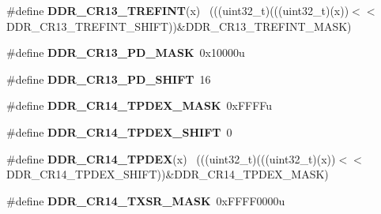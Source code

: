 \begin{DoxyCompactItemize}
\item 
\hypertarget{group___d_d_r___register___masks_ga8ed5ff0b56124f79d539d04e62c76d9a}{}\#define {\bfseries D\+D\+R\+\_\+\+C\+R13\+\_\+\+T\+R\+E\+F\+I\+N\+T}(x)                                        ~(((uint32\+\_\+t)(((uint32\+\_\+t)(x))$<$$<$D\+D\+R\+\_\+\+C\+R13\+\_\+\+T\+R\+E\+F\+I\+N\+T\+\_\+\+S\+H\+I\+F\+T))\&D\+D\+R\+\_\+\+C\+R13\+\_\+\+T\+R\+E\+F\+I\+N\+T\+\_\+\+M\+A\+S\+K)\label{group___d_d_r___register___masks_ga8ed5ff0b56124f79d539d04e62c76d9a}

\item 
\hypertarget{group___d_d_r___register___masks_ga048994e5d2218a1a9c46183cc17354f7}{}\#define {\bfseries D\+D\+R\+\_\+\+C\+R13\+\_\+\+P\+D\+\_\+\+M\+A\+S\+K}~0x10000u\label{group___d_d_r___register___masks_ga048994e5d2218a1a9c46183cc17354f7}

\item 
\hypertarget{group___d_d_r___register___masks_ga079e720b7f261f2e33ff1cfde3601035}{}\#define {\bfseries D\+D\+R\+\_\+\+C\+R13\+\_\+\+P\+D\+\_\+\+S\+H\+I\+F\+T}~16\label{group___d_d_r___register___masks_ga079e720b7f261f2e33ff1cfde3601035}

\item 
\hypertarget{group___d_d_r___register___masks_ga992a5c28097e3e0df2cfefb38eaf1911}{}\#define {\bfseries D\+D\+R\+\_\+\+C\+R14\+\_\+\+T\+P\+D\+E\+X\+\_\+\+M\+A\+S\+K}~0x\+F\+F\+F\+Fu\label{group___d_d_r___register___masks_ga992a5c28097e3e0df2cfefb38eaf1911}

\item 
\hypertarget{group___d_d_r___register___masks_gac93676bed2437d49be17367214d00bcc}{}\#define {\bfseries D\+D\+R\+\_\+\+C\+R14\+\_\+\+T\+P\+D\+E\+X\+\_\+\+S\+H\+I\+F\+T}~0\label{group___d_d_r___register___masks_gac93676bed2437d49be17367214d00bcc}

\item 
\hypertarget{group___d_d_r___register___masks_ga82a3988ed7184da2145458ace7e3e6dc}{}\#define {\bfseries D\+D\+R\+\_\+\+C\+R14\+\_\+\+T\+P\+D\+E\+X}(x)                                            ~(((uint32\+\_\+t)(((uint32\+\_\+t)(x))$<$$<$D\+D\+R\+\_\+\+C\+R14\+\_\+\+T\+P\+D\+E\+X\+\_\+\+S\+H\+I\+F\+T))\&D\+D\+R\+\_\+\+C\+R14\+\_\+\+T\+P\+D\+E\+X\+\_\+\+M\+A\+S\+K)\label{group___d_d_r___register___masks_ga82a3988ed7184da2145458ace7e3e6dc}

\item 
\hypertarget{group___d_d_r___register___masks_ga6d0d2a7f838400bb36fa7b0e4a74d178}{}\#define {\bfseries D\+D\+R\+\_\+\+C\+R14\+\_\+\+T\+X\+S\+R\+\_\+\+M\+A\+S\+K}~0x\+F\+F\+F\+F0000u\label{group___d_d_r___register___masks_ga6d0d2a7f838400bb36fa7b0e4a74d178}


\end{DoxyCompactItemize}

